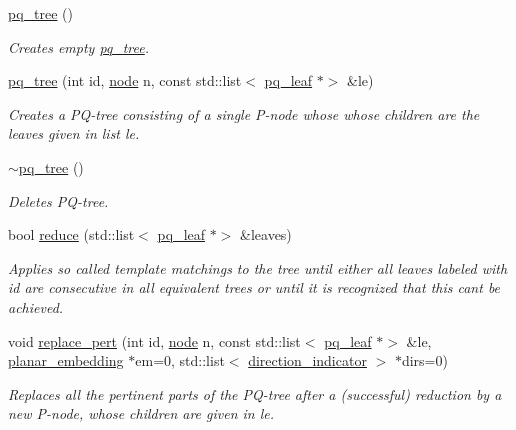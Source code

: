\begin{DoxyCompactItemize}
\item 
\mbox{\hyperlink{classpq__tree_afea06921780eb07ddb36294b109964d0}{pq\+\_\+tree}} ()
\begin{DoxyCompactList}\small\item\em Creates empty \mbox{\hyperlink{classpq__tree}{pq\+\_\+tree}}. \end{DoxyCompactList}\item 
\mbox{\hyperlink{classpq__tree_a417e48f22a3be82238916fe95ce9c840}{pq\+\_\+tree}} (int id, \mbox{\hyperlink{classnode}{node}} n, const std\+::list$<$ \mbox{\hyperlink{classpq__leaf}{pq\+\_\+leaf}} $\ast$$>$ \&le)
\begin{DoxyCompactList}\small\item\em Creates a P\+Q-\/tree consisting of a single P-\/node whose whose children are the leaves given in list {\ttfamily le}. \end{DoxyCompactList}\item 
\mbox{\hyperlink{classpq__tree_ae6b44b3a6db8914beb368aee2bf7cc92}{$\sim$pq\+\_\+tree}} ()
\begin{DoxyCompactList}\small\item\em Deletes P\+Q-\/tree. \end{DoxyCompactList}\item 
bool \mbox{\hyperlink{classpq__tree_a390598b675cb86952ab8cfb444056eb8}{reduce}} (std\+::list$<$ \mbox{\hyperlink{classpq__leaf}{pq\+\_\+leaf}} $\ast$$>$ \&leaves)
\begin{DoxyCompactList}\small\item\em Applies so called template matchings to the tree until either all leaves labeled with {\ttfamily id} are consecutive in all equivalent trees or until it is recognized that this can\textquotesingle{}t be achieved. \end{DoxyCompactList}\item 
void \mbox{\hyperlink{classpq__tree_ae98dec503a8e312db7fd5f28360f3f0e}{replace\+\_\+pert}} (int id, \mbox{\hyperlink{classnode}{node}} n, const std\+::list$<$ \mbox{\hyperlink{classpq__leaf}{pq\+\_\+leaf}} $\ast$$>$ \&le, \mbox{\hyperlink{classplanar__embedding}{planar\+\_\+embedding}} $\ast$em=0, std\+::list$<$ \mbox{\hyperlink{classdirection__indicator}{direction\+\_\+indicator}} $>$ $\ast$dirs=0)
\begin{DoxyCompactList}\small\item\em Replaces all the pertinent parts of the P\+Q-\/tree after a (successful) reduction by a new P-\/node, whose children are given in {\ttfamily le}. \end{DoxyCompactList}\item 
$$
\end{DoxyCompactItemize}
